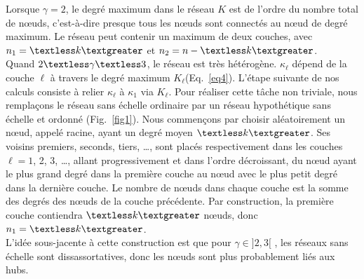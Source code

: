 Lorsque $\gamma=2$, le degré maximum dans le réseau $K$ est de l'ordre du nombre total de nœuds, c'est-à-dire  presque tous les nœuds sont connectés au nœud de degré maximum. Le réseau peut contenir un maximum de deux couches, avec $n_1=\km$ et $n_2=n-\km $. \\
Quand $2\textless \gamma \textless 3$, le réseau est très hétérogène. $\kappa_{\ell} $ dépend de la couche $\ell$ à travers le degré maximum $K_{\ell}$(Eq.~\eqref{eq4}). L'étape suivante de nos calculs consiste à relier $\kappa_{\ell}$ à $\kappa_1$ via $K_{\ell}$. Pour réaliser cette tâche non triviale, nous remplaçons le réseau sans échelle ordinaire par un réseau hypothétique sans échelle et ordonné (Fig.~\ref{fig1}). Nous commençons par choisir aléatoirement un nœud, appelé racine, ayant un degré moyen $\km$. Ses  voisins premiers, seconds, tiers, \ldots, sont placés respectivement dans les couches $\ell=1$, 2, 3, \ldots, allant progressivement et dans l'ordre décroissant, du nœud ayant le plus grand degré dans la première couche au nœud avec le plus petit degré dans la dernière couche. Le nombre de nœuds dans chaque couche est la somme des degrés des nœuds de la couche précédente. Par construction, la première couche contiendra $\km$ nœuds, donc $n_1=\km$.\\
L'idée sous-jacente à cette construction est que pour $\gamma \in ]2,3[$ , les réseaux sans échelle  sont dissassortatives, donc les nœuds sont plus probablement liés aux hubs.\\
